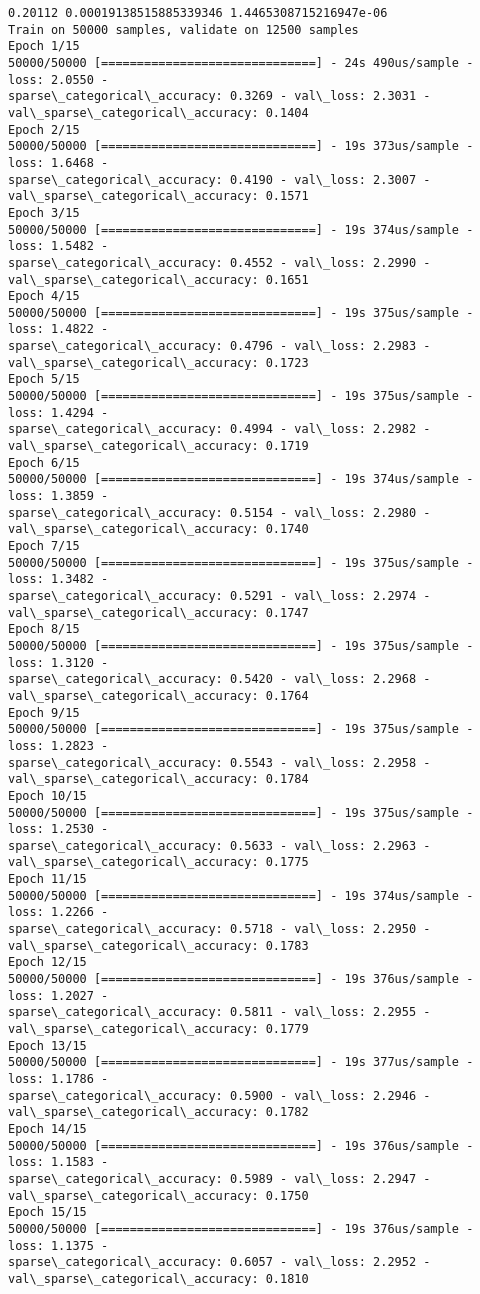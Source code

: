 \documentclass[11pt]{article}
\begin{document}
    \begin{Verbatim}[commandchars=\\\{\}]
0.20112 0.00019138515885339346 1.4465308715216947e-06
Train on 50000 samples, validate on 12500 samples
Epoch 1/15
50000/50000 [==============================] - 24s 490us/sample - loss: 2.0550 -
sparse\_categorical\_accuracy: 0.3269 - val\_loss: 2.3031 -
val\_sparse\_categorical\_accuracy: 0.1404
Epoch 2/15
50000/50000 [==============================] - 19s 373us/sample - loss: 1.6468 -
sparse\_categorical\_accuracy: 0.4190 - val\_loss: 2.3007 -
val\_sparse\_categorical\_accuracy: 0.1571
Epoch 3/15
50000/50000 [==============================] - 19s 374us/sample - loss: 1.5482 -
sparse\_categorical\_accuracy: 0.4552 - val\_loss: 2.2990 -
val\_sparse\_categorical\_accuracy: 0.1651
Epoch 4/15
50000/50000 [==============================] - 19s 375us/sample - loss: 1.4822 -
sparse\_categorical\_accuracy: 0.4796 - val\_loss: 2.2983 -
val\_sparse\_categorical\_accuracy: 0.1723
Epoch 5/15
50000/50000 [==============================] - 19s 375us/sample - loss: 1.4294 -
sparse\_categorical\_accuracy: 0.4994 - val\_loss: 2.2982 -
val\_sparse\_categorical\_accuracy: 0.1719
Epoch 6/15
50000/50000 [==============================] - 19s 374us/sample - loss: 1.3859 -
sparse\_categorical\_accuracy: 0.5154 - val\_loss: 2.2980 -
val\_sparse\_categorical\_accuracy: 0.1740
Epoch 7/15
50000/50000 [==============================] - 19s 375us/sample - loss: 1.3482 -
sparse\_categorical\_accuracy: 0.5291 - val\_loss: 2.2974 -
val\_sparse\_categorical\_accuracy: 0.1747
Epoch 8/15
50000/50000 [==============================] - 19s 375us/sample - loss: 1.3120 -
sparse\_categorical\_accuracy: 0.5420 - val\_loss: 2.2968 -
val\_sparse\_categorical\_accuracy: 0.1764
Epoch 9/15
50000/50000 [==============================] - 19s 375us/sample - loss: 1.2823 -
sparse\_categorical\_accuracy: 0.5543 - val\_loss: 2.2958 -
val\_sparse\_categorical\_accuracy: 0.1784
Epoch 10/15
50000/50000 [==============================] - 19s 375us/sample - loss: 1.2530 -
sparse\_categorical\_accuracy: 0.5633 - val\_loss: 2.2963 -
val\_sparse\_categorical\_accuracy: 0.1775
Epoch 11/15
50000/50000 [==============================] - 19s 374us/sample - loss: 1.2266 -
sparse\_categorical\_accuracy: 0.5718 - val\_loss: 2.2950 -
val\_sparse\_categorical\_accuracy: 0.1783
Epoch 12/15
50000/50000 [==============================] - 19s 376us/sample - loss: 1.2027 -
sparse\_categorical\_accuracy: 0.5811 - val\_loss: 2.2955 -
val\_sparse\_categorical\_accuracy: 0.1779
Epoch 13/15
50000/50000 [==============================] - 19s 377us/sample - loss: 1.1786 -
sparse\_categorical\_accuracy: 0.5900 - val\_loss: 2.2946 -
val\_sparse\_categorical\_accuracy: 0.1782
Epoch 14/15
50000/50000 [==============================] - 19s 376us/sample - loss: 1.1583 -
sparse\_categorical\_accuracy: 0.5989 - val\_loss: 2.2947 -
val\_sparse\_categorical\_accuracy: 0.1750
Epoch 15/15
50000/50000 [==============================] - 19s 376us/sample - loss: 1.1375 -
sparse\_categorical\_accuracy: 0.6057 - val\_loss: 2.2952 -
val\_sparse\_categorical\_accuracy: 0.1810
    \end{Verbatim}
\end{document}
